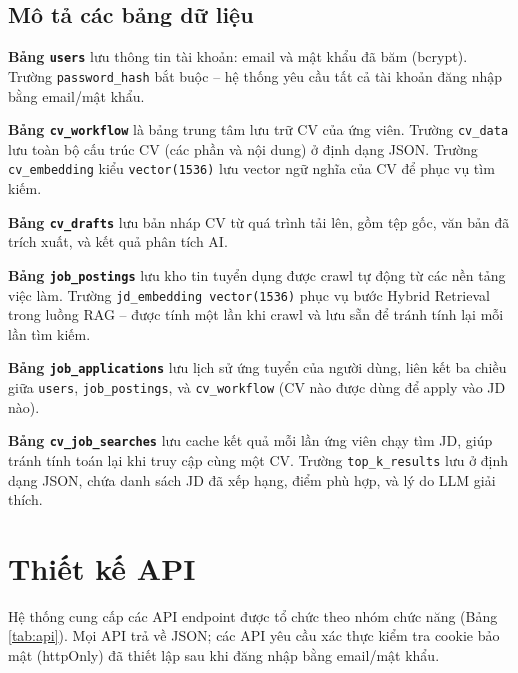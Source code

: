 \documentclass[../DoAn.tex]{subfiles}
\begin{document}
\subsection{Mô tả các bảng dữ liệu}

\textbf{Bảng \texttt{users}} lưu thông tin tài khoản: email và mật khẩu đã băm (bcrypt). Trường \texttt{password\_hash} bắt buộc -- hệ thống yêu cầu tất cả tài khoản đăng nhập bằng email/mật khẩu.

\textbf{Bảng \texttt{cv\_workflow}} là bảng trung tâm lưu trữ CV của ứng viên. Trường \texttt{cv\_data} lưu toàn bộ cấu trúc CV (các phần và nội dung) ở định dạng JSON. Trường \texttt{cv\_embedding} kiểu \texttt{vector(1536)} lưu vector ngữ nghĩa của CV để phục vụ tìm kiếm.

\textbf{Bảng \texttt{cv\_drafts}} lưu bản nháp CV từ quá trình tải lên, gồm tệp gốc, văn bản đã trích xuất, và kết quả phân tích AI.

\textbf{Bảng \texttt{job\_postings}} lưu kho tin tuyển dụng được crawl tự động từ các nền tảng việc làm. Trường \texttt{jd\_embedding vector(1536)} phục vụ bước Hybrid Retrieval trong luồng RAG -- được tính một lần khi crawl và lưu sẵn để tránh tính lại mỗi lần tìm kiếm.

\textbf{Bảng \texttt{job\_applications}} lưu lịch sử ứng tuyển của người dùng, liên kết ba chiều giữa \texttt{users}, \texttt{job\_postings}, và \texttt{cv\_workflow} (CV nào được dùng để apply vào JD nào).

\textbf{Bảng \texttt{cv\_job\_searches}} lưu cache kết quả mỗi lần ứng viên chạy tìm JD, giúp tránh tính toán lại khi truy cập cùng một CV. Trường \texttt{top\_k\_results} lưu ở định dạng JSON, chứa danh sách JD đã xếp hạng, điểm phù hợp, và lý do LLM giải thích.

\section{Thiết kế API}

Hệ thống cung cấp các API endpoint được tổ chức theo nhóm chức năng (Bảng \ref{tab:api}). Mọi API trả về JSON; các API yêu cầu xác thực kiểm tra cookie bảo mật (httpOnly) đã thiết lập sau khi đăng nhập bằng email/mật khẩu.
\end{document}
